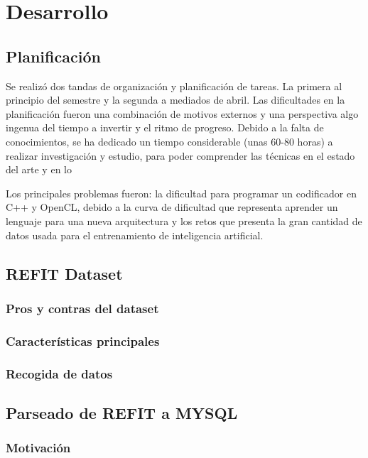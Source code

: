 \chapter{Desarrollo}
\label{ch:desarrollo}

\section{Planificación}
\label{sec:planificacion}
Se realizó dos tandas de organización y planificación de tareas. La primera al principio del semestre y la segunda a mediados de abril. 
Las dificultades en la planificación fueron una combinación de motivos externos y una perspectiva algo ingenua del tiempo a invertir y el ritmo de progreso.
Debido a la falta de conocimientos, se ha dedicado un tiempo considerable (unas 60-80 horas) a realizar investigación y estudio, para poder comprender las técnicas  en el estado del arte y en lo 

Los principales problemas fueron: la dificultad para programar un codificador en C++ y OpenCL, debido a la curva de dificultad que representa aprender un lenguaje para una nueva arquitectura y los retos que presenta la gran cantidad de datos usada para el entrenamiento de inteligencia artificial. 


\section{REFIT Dataset}
\subsection{Pros y contras del dataset}
\subsection{Características principales}
\subsection{Recogida de datos}

\section{Parseado de REFIT a MYSQL}
\subsection{Motivación}
